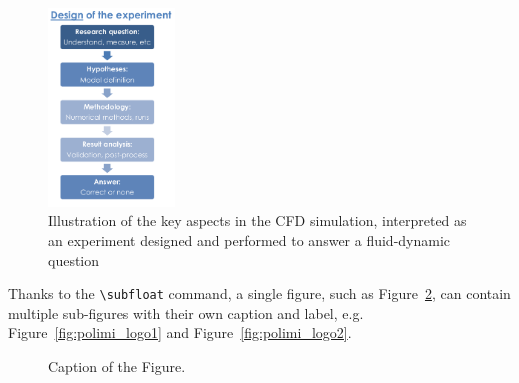 \documentclass[11pt,a4paper]{article}
\begin{document}
\begin{figure}\centering
    \includegraphics[width=0.3\textwidth]{Images/designExp}
    \caption{Illustration of the key aspects in the CFD simulation, interpreted as an experiment designed and performed to answer a fluid-dynamic question}
    \label{fig:cfdstep}
\end{figure}

Thanks to the \texttt{\textbackslash subfloat} command, a single figure, such as Figure~\ref{fig:quadtree2},
can contain multiple sub-figures with their own caption and label, e.g. Figure~\ref{fig:polimi_logo1} and Figure~\ref{fig:polimi_logo2}. 

\begin{figure}
    \centering
    \quad
    \caption[]{Caption of the Figure.}
    \label{fig:quadtree2}
\end{figure}
\end{document}
